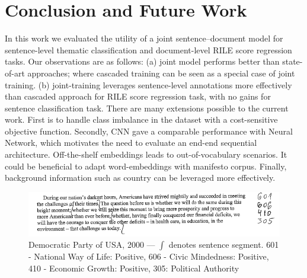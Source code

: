 \documentclass[11pt,a4paper]{article}
\begin{document}
\section{Conclusion and Future Work}
In this work we evaluated the utility of a joint sentence--document model for sentence-level thematic classification and document-level RILE score regression tasks. Our observations are as follows: (a) joint model performs better than state-of-art approaches; where cascaded training can be seen as a special case of joint training. (b) joint-training leverages sentence-level annotations more effectively than cascaded approach for RILE score regression task, with no gains for sentence classification task. There are many extensions possible to the current work. First is to handle class imbalance in the dataset with a cost-sensitive objective function. Secondly, CNN gave a comparable performance with Neural Network, which motivates the need to evaluate an end-end sequential architecture. Off-the-shelf embeddings leads to out-of-vocabulary scenarios. It could be beneficial to  adapt word-embeddings with manifesto corpus. Finally, background information such as country can be leveraged more effectively.


\begin{figure}[!htp]
\includegraphics[width=1\linewidth]{US_Democrats_1.png}
\caption{Democratic Party of USA, 2000 --- $\int$ denotes sentence segment. 601 - National Way of Life: Positive, 606 - Civic Mindedness: Positive, 410 - Economic Growth: Positive, 305: Political Authority}
\label{fig:sub2}
\end{figure}

\end{document}
